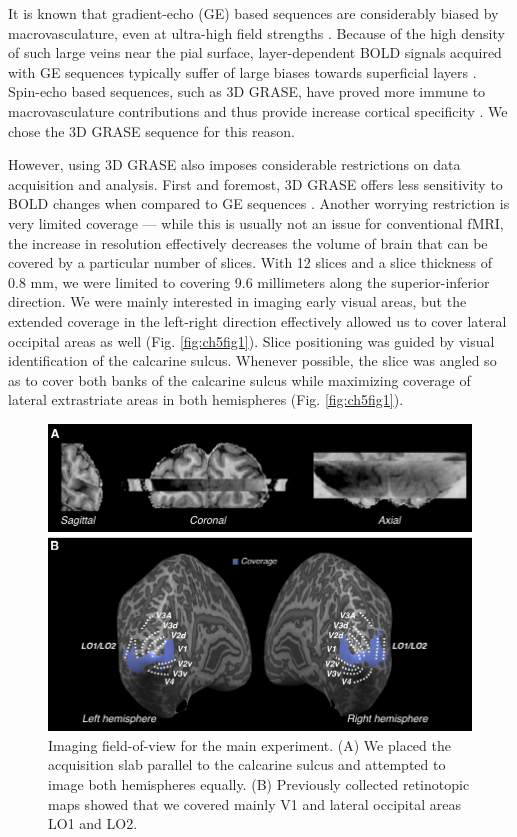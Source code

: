 It is known that gradient-echo (GE) based sequences are considerably biased by macrovasculature, even at ultra-high field strengths \cite{DeMartino:2013qy}. Because of the high density of such large veins near the pial surface, layer-dependent BOLD signals acquired with GE sequences typically suffer of large biases towards superficial layers \cite{Polimeni:2010fl,Koopmans:2010hq}. Spin-echo based sequences, such as 3D GRASE, have proved more immune to macrovasculature contributions and thus provide increase cortical specificity \cite{DeMartino:2013qy}. We chose the 3D GRASE sequence for this reason.

However, using 3D GRASE also imposes considerable restrictions on data acquisition and analysis. First and foremost, 3D GRASE offers less sensitivity to BOLD changes when compared to GE sequences \cite{DeMartino:2013qy}. Another worrying restriction is very limited coverage --- while this is usually not an issue for conventional fMRI, the increase in resolution effectively decreases the volume of brain that can be covered by a particular number of slices. With 12 slices and a slice thickness of 0.8 mm, we were limited to covering 9.6 millimeters along the superior-inferior direction. We were mainly interested in imaging early visual areas, but the extended coverage in the left-right direction effectively allowed us to cover lateral occipital areas as well (Fig. \ref{fig:ch5fig1}). Slice positioning was guided by visual identification of the calcarine sulcus. Whenever possible, the slice was angled so as to cover both banks of the calcarine sulcus while maximizing coverage of lateral extrastriate areas in both hemispheres (Fig. \ref{fig:ch5fig1}).

\begin{figure}
  \centering
  \includegraphics[keepaspectratio]{Fig2.pdf}
  \caption[Imaging field-of-view for the main experiment.]{Imaging field-of-view for the main experiment. (A) We placed the acquisition slab parallel to the calcarine sulcus and attempted to image both hemispheres equally. (B) Previously collected retinotopic maps showed that we covered mainly V1 and lateral occipital areas LO1 and LO2.}
  \label{fig:ch5fig2}
\end{figure}

